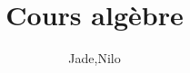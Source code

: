 \documentclass{article}          %
\begin{document}
\title{Cours alg\`ebre}
\author{Jade,Nilo}
\maketitle
\tableofcontents

\newpage
\end{document}
